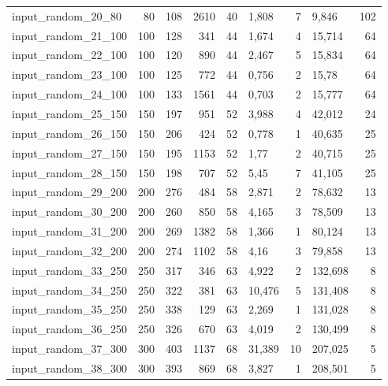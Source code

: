 \begin{landscape}
\begin{longtable}{|l|r|r|r|r|l|r|l|r|}
    input\_random\_20\_80  & 80    & 108   & 2610  & 40    & 1,808  & 7     & 9,846     & 102   \\
    input\_random\_21\_100 & 100   & 128   & 341   & 44    & 1,674  & 4     & 15,714    & 64   \\
    input\_random\_22\_100 & 100   & 120   & 890   & 44    & 2,467  & 5     & 15,834    & 64   \\
    input\_random\_23\_100 & 100   & 125   & 772   & 44    & 0,756  & 2     & 15,78     & 64   \\
    input\_random\_24\_100 & 100   & 133   & 1561  & 44    & 0,703  & 2     & 15,777    & 64   \\
    input\_random\_25\_150 & 150   & 197   & 951   & 52    & 3,988  & 4     & 42,012    & 24   \\
    input\_random\_26\_150 & 150   & 206   & 424   & 52    & 0,778  & 1     & 40,635    & 25   \\
    input\_random\_27\_150 & 150   & 195   & 1153  & 52    & 1,77   & 2     & 40,715    & 25   \\
    input\_random\_28\_150 & 150   & 198   & 707   & 52    & 5,45   & 7     & 41,105    & 25   \\
    input\_random\_29\_200 & 200   & 276   & 484   & 58    & 2,871  & 2     & 78,632    & 13   \\
    input\_random\_30\_200 & 200   & 260   & 850   & 58    & 4,165  & 3     & 78,509    & 13   \\
    input\_random\_31\_200 & 200   & 269   & 1382  & 58    & 1,366  & 1     & 80,124    & 13   \\
    input\_random\_32\_200 & 200   & 274   & 1102  & 58    & 4,16   & 3     & 79,858    & 13   \\
    input\_random\_33\_250 & 250   & 317   & 346   & 63    & 4,922  & 2     & 132,698   & 8   \\
    input\_random\_34\_250 & 250   & 322   & 381   & 63    & 10,476 & 5     & 131,408   & 8   \\
    input\_random\_35\_250 & 250   & 338   & 129   & 63    & 2,269  & 1     & 131,028   & 8   \\
    input\_random\_36\_250 & 250   & 326   & 670   & 63    & 4,019  & 2     & 130,499   & 8   \\
    input\_random\_37\_300 & 300   & 403   & 1137  & 68    & 31,389 & 10    & 207,025   & 5   \\
    input\_random\_38\_300 & 300   & 393   & 869   & 68    & 3,827  & 1     & 208,501   & 5   \\

\end{longtable}
\end{landscape}
